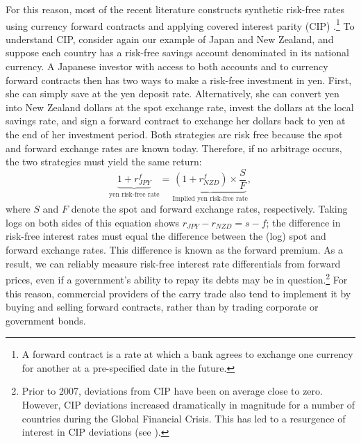 \documentclass{ar-1col}
\begin{document}
\begin{textbox}[]
    For this reason, most of the recent literature constructs synthetic risk-free rates using currency forward contracts and applying covered interest parity (CIP) \citep{LustigRoussanovVerdelhan2011, DuSchreger2016}.\footnote{A forward contract is a rate at which a bank agrees to exchange one currency for another at a pre-specified date in the future.} To understand CIP, consider again our example of Japan and New Zealand, and suppose each country has a risk-free savings account denominated in its national currency. A Japanese investor with access to both accounts and to currency forward contracts then has two ways to make a risk-free investment in yen. First, she can simply save at the yen deposit rate. Alternatively, she can convert yen into New Zealand dollars at the spot exchange rate, invest the dollars at the local savings rate, and sign a forward contract to exchange her dollars back to yen at the end of her investment period. Both strategies are risk free because the spot and forward exchange rates are known today. Therefore, if no arbitrage occurs, the two strategies must yield the same return:
    \begin{equation}
    \underbrace{1 + r^f_{JPY}}_{\text{yen risk-free rate}}
    = \underbrace{
        (1 + r^f_{NZD}) \times \frac{S}{F}
    }_{\text{Implied yen risk-free rate}},
    \label{eqn:CIP}
    \end{equation}
    where $S$ and $F$ denote the spot and forward exchange rates, respectively. Taking logs on both sides of this equation shows $r_{JPY}-r_{NZD} = s - f$; the difference in risk-free interest rates must equal the difference between the (log) spot and forward exchange rates. This difference is known as the forward premium. As a result, we can reliably measure risk-free interest rate differentials from forward prices, even if a government's ability to repay its debts may be in question.\footnote{Prior to 2007, deviations from CIP have been on average close to zero. However, CIP deviations increased dramatically in magnitude for a number of countries during the Global Financial Crisis. This has led to a resurgence of interest in CIP deviations (see \citet{DuTepperVerdelhan2018}).} For this reason, commercial providers of the carry trade also tend to implement it by buying and selling forward contracts, rather than by trading corporate or government bonds.
\end{textbox}
\end{document}

